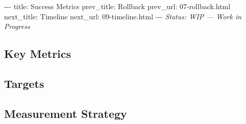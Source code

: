 \documentclass[12pt,a4paper]{article}
\begin{document}
-\/-\/- title: Success Metrics prev\_title: Rollback prev\_url:
07-rollback.html next\_title: Timeline next\_url: 09-timeline.html
-\/-\/- \emph{Status: WIP --- Work in Progress}

\subsection{Key Metrics}\label{key-metrics}

\subsection{Targets}\label{targets}

\subsection{Measurement Strategy}\label{measurement-strategy}
\end{document}
